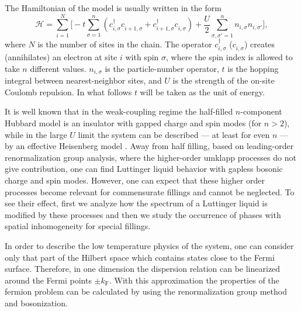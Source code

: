 \documentclass[aps,prb,twocolumn,floatfix,showpacs]{revtex4}
\begin{document}
The Hamiltonian of the model is usually written in the form
\begin{equation} 
  \label{eq:ham}
  {\mathcal H} = \sum_{i=1}^N \bigg[ -t \sum_{\sigma=1}^n (c_{i,\sigma}^\dagger
  c_{i+1,\sigma}^{\phantom \dagger} + c_{i+1,\sigma}^\dagger
  c_{i,\sigma}^{\phantom\dagger}) +
  \frac{U}{2} \sum_{\sigma,\sigma'=1 }^n n_{i, \sigma}n_{i,\sigma'}
  \bigg] ,
\end{equation}
where $N$ is the number of sites in the chain. The operator
$c_{i,\sigma}^\dagger$ ($c_{i,\sigma}^{\phantom \dagger}$) creates
(annihilates) an electron at site $i$ with spin $\sigma$, where the spin index
is allowed to take $n$ different values. $n_{i,\sigma}$ is the particle-number
operator, $t$ is the hopping integral between nearest-neighbor sites, and $U$
is the strength of the on-site Coulomb repulsion.  In what follows $t$ will be
taken as the unit of energy.




It is well known that in the weak-coupling regime the half-filled
$n$-component Hubbard model is an insulator with gapped charge and spin modes
(for $n>2$), while in the large $U$ limit the system can be described --- at
least for even $n$ --- by an effective Heisenberg model \cite{marston,
szirmai01}. Away from half filling, based on leading-order renormalization
group analysis, where the higher-order umklapp processes do not give
contribution, one can find Luttinger liquid behavior with gapless bosonic
charge and spin modes. However, one can expect that these higher order
processes become relevant for commensurate fillings and cannot be
neglected. To see their effect, first we analyze how the spectrum of a
Luttinger liquid is modified by these processes and then we study the
occurrence of phases with spatial inhomogeneity for special fillings.

In order to describe the low temperature physics of the system, one can
consider only that part of the Hilbert space which contains states close to
the Fermi surface. Therefore, in one dimension the dispersion relation can be
linearized around the Fermi points $\pm k_{\mathrm{F}}$. With this
approximation the properties of the fermion problem can be calculated by using
the renormalization group method and bosonization. 
\end{document}
